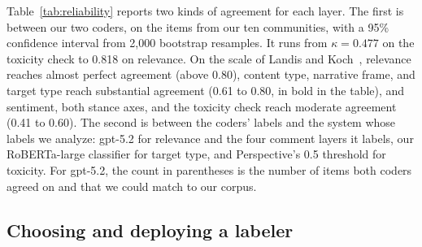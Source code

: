 Table~\ref{tab:reliability} reports two kinds of agreement for each layer. The first is between our two coders, on the items from our ten communities, with a 95\% confidence interval from 2,000 bootstrap resamples. It runs from $\kappa = 0.477$ on the toxicity check to 0.818 on relevance. On the scale of Landis and Koch~\cite{landis1977measurement}, relevance reaches almost perfect agreement (above 0.80), content type, narrative frame, and target type reach substantial agreement (0.61 to 0.80, in bold in the table), and sentiment, both stance axes, and the toxicity check reach moderate agreement (0.41 to 0.60). The second is between the coders' labels and the system whose labels we analyze: gpt-5.2 for relevance and the four comment layers it labels, our RoBERTa-large classifier for target type, and Perspective's 0.5 threshold for toxicity. For gpt-5.2, the count in parentheses is the number of items both coders agreed on and that we could match to our corpus.

\subsection{Choosing and deploying a labeler}
\label{sec:data-labeller}

